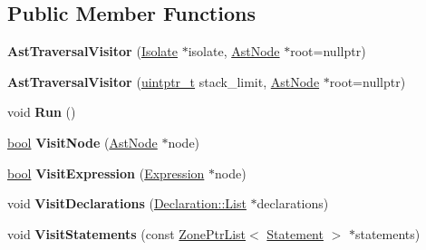 \subsection*{Public Member Functions}
\begin{DoxyCompactItemize}
\item 
\mbox{\label{classv8_1_1internal_1_1AstTraversalVisitor_a881dbfb74ee2416c9f4a8ef71f0f9c74}} 
{\bfseries Ast\+Traversal\+Visitor} (\mbox{\hyperlink{classv8_1_1internal_1_1Isolate}{Isolate}} $\ast$isolate, \mbox{\hyperlink{classv8_1_1internal_1_1AstNode}{Ast\+Node}} $\ast$root=nullptr)
\item 
\mbox{\label{classv8_1_1internal_1_1AstTraversalVisitor_a3a7ce55f7e166f6e7ebc89072e2aadd2}} 
{\bfseries Ast\+Traversal\+Visitor} (\mbox{\hyperlink{classuintptr__t}{uintptr\+\_\+t}} stack\+\_\+limit, \mbox{\hyperlink{classv8_1_1internal_1_1AstNode}{Ast\+Node}} $\ast$root=nullptr)
\item 
\mbox{\label{classv8_1_1internal_1_1AstTraversalVisitor_afe163b4479284434c6ff60ed6dd42b29}} 
void {\bfseries Run} ()
\item 
\mbox{\label{classv8_1_1internal_1_1AstTraversalVisitor_ac8f5b1fc71c93d27f518342f61e2af08}} 
\mbox{\hyperlink{classbool}{bool}} {\bfseries Visit\+Node} (\mbox{\hyperlink{classv8_1_1internal_1_1AstNode}{Ast\+Node}} $\ast$node)
\item 
\mbox{\label{classv8_1_1internal_1_1AstTraversalVisitor_aaaf9bb5042fa8255f45ea6031cf57d91}} 
\mbox{\hyperlink{classbool}{bool}} {\bfseries Visit\+Expression} (\mbox{\hyperlink{classv8_1_1internal_1_1Expression}{Expression}} $\ast$node)
\item 
\mbox{\label{classv8_1_1internal_1_1AstTraversalVisitor_a1b35ea5214a9288da0b1338f635e5978}} 
void {\bfseries Visit\+Declarations} (\mbox{\hyperlink{classv8_1_1base_1_1ThreadedListBase}{Declaration\+::\+List}} $\ast$declarations)
\item 
\mbox{\label{classv8_1_1internal_1_1AstTraversalVisitor_a304bcfd0fae381c1f0ac1f66256d350b}} 
void {\bfseries Visit\+Statements} (const \mbox{\hyperlink{classv8_1_1internal_1_1ZoneList}{Zone\+Ptr\+List}}$<$ \mbox{\hyperlink{classv8_1_1internal_1_1Statement}{Statement}} $>$ $\ast$statements)
\end{DoxyCompactItemize}
